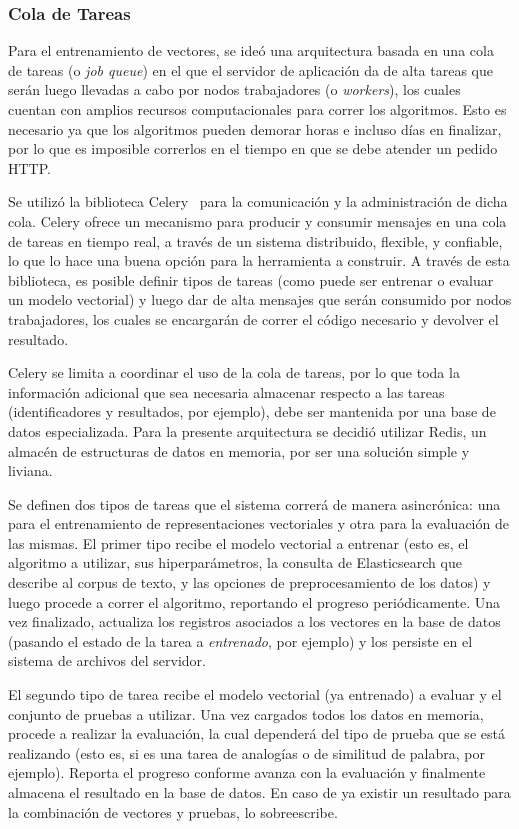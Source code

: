 \subsubsection{Cola de Tareas}

Para el entrenamiento de vectores, se ideó una arquitectura basada en una cola de tareas (o
\textit{job queue}) en el que el servidor de aplicación da de alta tareas que serán luego llevadas a
cabo por nodos trabajadores (o \textit{workers}), los cuales cuentan con amplios recursos
computacionales para correr los algoritmos. Esto es necesario ya que los algoritmos pueden demorar
horas e incluso días en finalizar, por lo que es imposible correrlos en el tiempo en que se debe
atender un pedido HTTP\@.

Se utilizó la biblioteca Celery~\cite{Celery} para la comunicación y la administración de dicha
cola. Celery ofrece un mecanismo para producir y consumir mensajes en una cola de tareas en tiempo
real, a través de un sistema distribuido, flexible, y confiable, lo que lo hace una buena opción
para la herramienta a construir. A través de esta biblioteca, es posible definir tipos de tareas
(como puede ser entrenar o evaluar un modelo vectorial) y luego dar de alta mensajes que serán
consumido por nodos trabajadores, los cuales se encargarán de correr el código necesario y devolver
el resultado.

Celery se limita a coordinar el uso de la cola de tareas, por lo que toda la información adicional
que sea necesaria almacenar respecto a las tareas (identificadores y resultados, por ejemplo), debe
ser mantenida por una base de datos especializada. Para la presente arquitectura se decidió utilizar
Redis, un almacén de estructuras de datos en memoria, por ser una solución simple y liviana.

Se definen dos tipos de tareas que el sistema correrá de manera asincrónica: una para el
entrenamiento de representaciones vectoriales y otra para la evaluación de las mismas. El primer tipo
recibe el modelo vectorial a entrenar (esto es, el algoritmo a utilizar, sus hiperparámetros, la
consulta de Elasticsearch que describe al corpus de texto, y las opciones de preprocesamiento de los
datos) y luego procede a correr el algoritmo, reportando el progreso periódicamente. Una vez
finalizado, actualiza los registros asociados a los vectores en la base de datos (pasando el estado
de la tarea a \textit{entrenado}, por ejemplo) y los persiste en el sistema de archivos del
servidor.

El segundo tipo de tarea recibe el modelo vectorial (ya entrenado) a evaluar y el conjunto de
pruebas a utilizar. Una vez cargados todos los datos en memoria, procede a realizar la evaluación,
la cual dependerá del tipo de prueba que se está realizando (esto es, si es una tarea de analogías o
de similitud de palabra, por ejemplo). Reporta el progreso conforme avanza con la evaluación y
finalmente almacena el resultado en la base de datos. En caso de ya existir un resultado para la
combinación de vectores y pruebas, lo sobreescribe.

